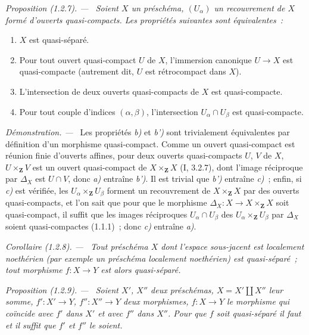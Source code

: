 \documentclass[10pt,oneside]{book}
\makeatletter
\newcommand{\setmanualcurrentlabel}[1]{\def\@currentlabel{#1}}
\newenvironment{proposition}[1][]{%
  \setmanualcurrentlabel{#1}\par\medskip\noindent\itshape Proposition (#1). ---\ }{\par}
\newenvironment{corollary}[1][]{%
  \setmanualcurrentlabel{#1}\par\medskip\noindent\itshape Corollaire (#1). ---\ }{\par}
\newenvironment{proof}{%
  \par\medskip\noindent\textit{Démonstration. ---\ }}{\par}
\makeatother
\begin{document}
\begin{proposition}[1.2.7]
\label{IV.1.2.7-fr}
Soient $X$ un préschéma, $(U_\alpha)$ un recouvrement de $X$ formé d'ouverts
quasi-compacts. Les propriétés suivantes sont équivalentes~:
\begin{enumerate}
  \item[a)] $X$ est quasi-séparé.
  \item[b)] Pour tout ouvert quasi-compact $U$ de $X$, l'immersion canonique
  $U\to X$ est quasi-compacte (autrement dit, $U$ est rétrocompact dans $X$).
  \item[b')] L'intersection de deux ouverts quasi-compacts de $X$ est
  quasi-compacte.
  \item[c)] Pour tout couple d'indices $(\alpha,\beta)$, l'intersection
  $U_\alpha\cap U_\beta$ est quasi-compacte.
\end{enumerate}
\end{proposition}

\begin{proof}
Les propriétés \emph{b)} et \emph{b')} sont trivialement équivalentes par
définition d'un morphisme quasi-compact. Comme un ouvert quasi-compact est
réunion finie d'ouverts affines, pour deux ouverts quasi-compacts $U$, $V$ de
$X$, $U\times_{\mathbf Z}V$ est un ouvert quasi-compact de
$X\times_{\mathbf Z}X$ (I, 3.2.7), dont l'image réciproque par $\Delta_X$ est
$U\cap V$, donc \emph{a)} entraîne \emph{b')}. Il est trivial que \emph{b')}
entraîne \emph{c)}~; enfin, si \emph{c)} est vérifiée, les
$U_\alpha\times_{\mathbf Z}U_\beta$ forment un recouvrement de
$X\times_{\mathbf Z}X$ par des ouverts quasi-compacts, et l'on sait que pour
que le morphisme $\Delta_X:X\to X\times_{\mathbf Z}X$ soit quasi-compact, il
suffit que les images réciproques $U_\alpha\cap U_\beta$ des
$U_\alpha\times_{\mathbf Z}U_\beta$ par $\Delta_X$ soient quasi-compactes
(1.1.1)~; donc \emph{c)} entraîne \emph{a)}.
\end{proof}

\begin{corollary}[1.2.8]
\label{IV.1.2.8-fr}
Tout préschéma $X$ dont l'espace sous-jacent est localement noethérien (par
exemple un préschéma localement noethérien) est quasi-séparé~; tout morphisme
$f:X\to Y$ est alors quasi-séparé.
\end{corollary}

\begin{proposition}[1.2.9]
\label{IV.1.2.9-fr}
Soient $X'$, $X''$ deux préschémas, $X=X'\coprod X''$ leur somme,
$f':X'\to Y$, $f'':X''\to Y$ deux morphismes, $f:X\to Y$ le morphisme qui
coïncide avec $f'$ dans $X'$ et avec $f''$ dans $X''$. Pour que $f$ soit
quasi-séparé il faut et il suffit que $f'$ et $f''$ le soient.
\end{proposition}
\end{document}
